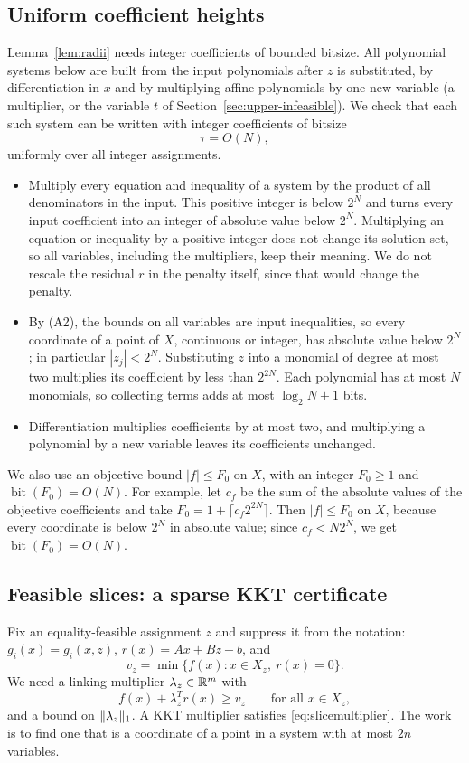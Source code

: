 \subsection{Uniform coefficient heights}
Lemma~\ref{lem:radii} needs integer coefficients of bounded bitsize. All
polynomial systems below are built from the input polynomials after $z$
is substituted, by differentiation in $x$ and by multiplying affine
polynomials by one new variable (a multiplier, or the variable $t$ of
Section~\ref{sec:upper-infeasible}). We check that each such system can
be written with integer coefficients of bitsize
\begin{equation}\label{eq:height}
 \tau=O(N),
\end{equation}
uniformly over all integer assignments.
\begin{itemize}
\item Multiply every equation and inequality of a system by the product
 of all denominators in the input. This positive integer is below $2^N$
 and turns every input coefficient into an integer of absolute value
 below $2^N$. Multiplying an equation or inequality by a positive integer
 does not change its solution set, so all variables, including the
 multipliers, keep their meaning. We do not rescale the residual $r$ in
 the penalty itself, since that would change the penalty.
\item By (A2), the bounds on all variables are input inequalities, so
 every coordinate of a point of $X$, continuous or integer, has absolute
 value below $2^N$; in particular $|z_j|<2^N$. Substituting $z$ into a monomial of degree at most two
 multiplies its coefficient by less than $2^{2N}$. Each polynomial has
 at most $N$ monomials, so collecting terms adds at most
 $\log_2N+1$ bits.
\item Differentiation multiplies coefficients by at most two, and
 multiplying a polynomial by a new variable leaves its coefficients
 unchanged.
\end{itemize}
We also use an objective bound $|f|\le F_0$ on $X$, with an integer
$F_0\ge1$ and $\operatorname{bit}(F_0)=O(N)$. For example, let $c_f$ be
the sum of the absolute values of the objective coefficients and take
$F_0=1+\lceil c_f2^{2N}\rceil$. Then $|f|\le F_0$ on $X$, because every
coordinate is below $2^N$ in absolute value; since $c_f<N2^N$, we get
$\operatorname{bit}(F_0)=O(N)$.

\subsection{Feasible slices: a sparse KKT certificate}
Fix an equality-feasible assignment $z$ and suppress it from the
notation: $g_i(x)=g_i(x,z)$, $r(x)=Ax+Bz-b$, and
\[
 v_z=\min\{f(x):x\in X_z,\ r(x)=0\}.
\]
We need a linking multiplier $\lambda_z\in\mathbb R^m$ with
\begin{equation}\label{eq:slicemultiplier}
 f(x)+\lambda_z^Tr(x)\ge v_z\qquad\text{for all }x\in X_z,
\end{equation}
and a bound on $\lVert\lambda_z\rVert_1$. A KKT multiplier satisfies
\eqref{eq:slicemultiplier}. The work is to find one that is a coordinate
of a point in a system with at most $2n$ variables.

